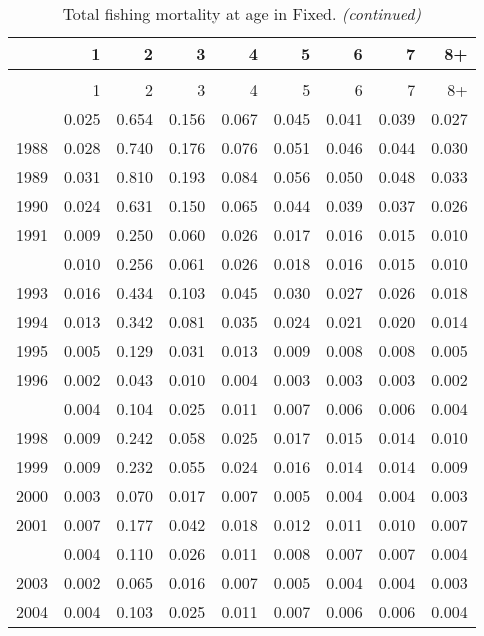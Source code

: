 \documentclass[
]{article}
\begin{document}
\begin{longtable}[t]{lrrrrrrrr}
\caption{\label{tab:Fixed-fleet-FAA-table}Total fishing mortality at age in Fixed.}\\
\toprule
  & 1 & 2 & 3 & 4 & 5 & 6 & 7 & 8+\\
\midrule
\endfirsthead
\caption[]{Total fishing mortality at age in Fixed. \textit{(continued)}}\\
\toprule
  & 1 & 2 & 3 & 4 & 5 & 6 & 7 & 8+\\
\midrule
\endhead

\endfoot
\bottomrule
\endlastfoot
1987 & 0.025 & 0.654 & 0.156 & 0.067 & 0.045 & 0.041 & 0.039 & 0.027\\
1988 & 0.028 & 0.740 & 0.176 & 0.076 & 0.051 & 0.046 & 0.044 & 0.030\\
1989 & 0.031 & 0.810 & 0.193 & 0.084 & 0.056 & 0.050 & 0.048 & 0.033\\
1990 & 0.024 & 0.631 & 0.150 & 0.065 & 0.044 & 0.039 & 0.037 & 0.026\\
1991 & 0.009 & 0.250 & 0.060 & 0.026 & 0.017 & 0.016 & 0.015 & 0.010\\
\addlinespace
1992 & 0.010 & 0.256 & 0.061 & 0.026 & 0.018 & 0.016 & 0.015 & 0.010\\
1993 & 0.016 & 0.434 & 0.103 & 0.045 & 0.030 & 0.027 & 0.026 & 0.018\\
1994 & 0.013 & 0.342 & 0.081 & 0.035 & 0.024 & 0.021 & 0.020 & 0.014\\
1995 & 0.005 & 0.129 & 0.031 & 0.013 & 0.009 & 0.008 & 0.008 & 0.005\\
1996 & 0.002 & 0.043 & 0.010 & 0.004 & 0.003 & 0.003 & 0.003 & 0.002\\
\addlinespace
1997 & 0.004 & 0.104 & 0.025 & 0.011 & 0.007 & 0.006 & 0.006 & 0.004\\
1998 & 0.009 & 0.242 & 0.058 & 0.025 & 0.017 & 0.015 & 0.014 & 0.010\\
1999 & 0.009 & 0.232 & 0.055 & 0.024 & 0.016 & 0.014 & 0.014 & 0.009\\
2000 & 0.003 & 0.070 & 0.017 & 0.007 & 0.005 & 0.004 & 0.004 & 0.003\\
2001 & 0.007 & 0.177 & 0.042 & 0.018 & 0.012 & 0.011 & 0.010 & 0.007\\
\addlinespace
2002 & 0.004 & 0.110 & 0.026 & 0.011 & 0.008 & 0.007 & 0.007 & 0.004\\
2003 & 0.002 & 0.065 & 0.016 & 0.007 & 0.005 & 0.004 & 0.004 & 0.003\\
2004 & 0.004 & 0.103 & 0.025 & 0.011 & 0.007 & 0.006 & 0.006 & 0.004\\

\end{longtable}
\end{document}
